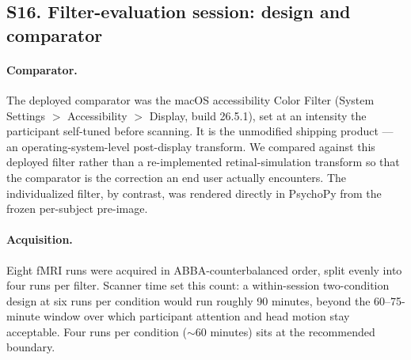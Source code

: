 
\subsection*{\textbf{S16. Filter-evaluation session: design and comparator}}
\label{app:filter_eval}

\paragraph{Comparator.}
The deployed comparator was the macOS accessibility Color Filter (System Settings $>$ Accessibility $>$ Display, build 26.5.1), set at an intensity the participant self-tuned before scanning. It is the unmodified shipping product --- an operating-system-level post-display transform. We compared against this deployed filter rather than a re-implemented retinal-simulation transform so that the comparator is the correction an end user actually encounters. The individualized filter, by contrast, was rendered directly in PsychoPy from the frozen per-subject pre-image.

\paragraph{Acquisition.}
Eight fMRI runs were acquired in ABBA-counterbalanced order, split evenly into four runs per filter. Scanner time set this count: a within-session two-condition design at six runs per condition would run roughly 90 minutes, beyond the 60--75-minute window over which participant attention and head motion stay acceptable. Four runs per condition ($\sim$60 minutes) sits at the recommended boundary.

